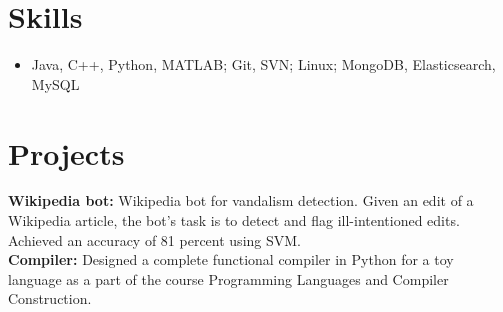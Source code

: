 \documentclass[letterpaper]{article}
\begin{document}
\section*{Skills}
\begin{itemize}
\item Java, C++, Python, MATLAB; Git, SVN; Linux; MongoDB, Elasticsearch, MySQL
\end{itemize}

\section*{Projects}
\textbf{Wikipedia bot:}
Wikipedia bot for vandalism detection. Given an edit of a Wikipedia article, the bot's task is to detect and flag ill-intentioned edits. Achieved an accuracy of 81 percent using SVM.\\
\textbf{Compiler:}
Designed a complete functional compiler in Python for a toy language as a part of the course Programming Languages and Compiler Construction.
\end{document}
